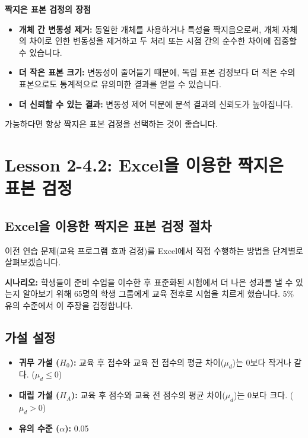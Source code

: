 \documentclass[11pt,a4paper]{article}
\begin{document}
\begin{summarybox}
\textbf{짝지은 표본 검정의 장점}
\begin{itemize}
    \item \textbf{개체 간 변동성 제거:} 동일한 개체를 사용하거나 특성을 짝지음으로써, 개체 자체의 차이로 인한 변동성을 제거하고 두 처리 또는 시점 간의 순수한 차이에 집중할 수 있습니다.
    \item \textbf{더 작은 표본 크기:} 변동성이 줄어들기 때문에, 독립 표본 검정보다 더 적은 수의 표본으로도 통계적으로 유의미한 결과를 얻을 수 있습니다.
    \item \textbf{더 신뢰할 수 있는 결과:} 변동성 제어 덕분에 분석 결과의 신뢰도가 높아집니다.
\end{itemize}
가능하다면 항상 짝지은 표본 검정을 선택하는 것이 좋습니다.
\end{summarybox}

\newpage
\section*{Lesson 2-4.2: Excel을 이용한 짝지은 표본 검정}

\subsection*{Excel을 이용한 짝지은 표본 검정 절차}
이전 연습 문제(교육 프로그램 효과 검정)를 Excel에서 직접 수행하는 방법을 단계별로 살펴보겠습니다.

\begin{examplebox}
\textbf{시나리오:}
학생들이 준비 수업을 이수한 후 표준화된 시험에서 더 나은 성과를 낼 수 있는지 알아보기 위해 65명의 학생 그룹에게 교육 전후로 시험을 치르게 했습니다. 5\% 유의 수준에서 이 주장을 검정합니다.
\end{examplebox}

\subsection*{가설 설정}
\begin{itemize}
    \item \textbf{귀무 가설 ($H_0$):} 교육 후 점수와 교육 전 점수의 평균 차이($\mu_d$)는 0보다 작거나 같다. ($\mu_d \le 0$)
    \item \textbf{대립 가설 ($H_A$):} 교육 후 점수와 교육 전 점수의 평균 차이($\mu_d$)는 0보다 크다. ($\mu_d > 0$)
    \item \textbf{유의 수준 ($\alpha$):} 0.05
\end{itemize}
\end{document}
